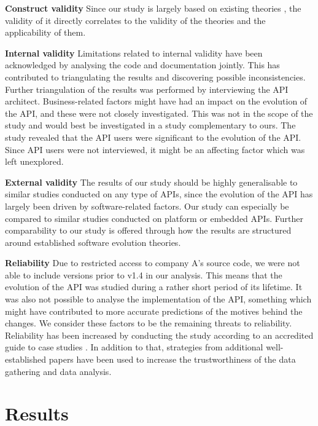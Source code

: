 \documentclass{sig-alternate}
\begin{document}
\smallskip \noindent
\textbf{Construct validity  } Since our study is largely based on existing theories \cite{chapin2001types, lehman90sview}, the validity of it directly correlates to the validity of the theories and the applicability of them. 

\smallskip \noindent
\textbf{Internal validity  } Limitations related to internal validity have been acknowledged by analysing the code and documentation jointly. This has contributed to triangulating the results and discovering possible inconsistencies. Further triangulation of the results was performed by interviewing the API architect. Business-related factors might have had an impact on the evolution of the API, and these were not closely investigated. This was not in the scope of the study and would best be investigated in a study complementary to ours. The study revealed that the API users were significant to the evolution of the API. Since API users were not interviewed, it might be an affecting factor which was left unexplored. 

\smallskip \noindent
\textbf{External validity  } The results of our study should be highly generalisable to similar studies conducted on any type of APIs, since the evolution of the API has largely been driven by software-related factors. Our study can especially be compared to similar studies conducted on platform or embedded APIs. Further comparability to our study is offered through how the results are structured around established software evolution theories. 

\smallskip \noindent
\textbf{Reliability  } Due to restricted access to company A's source code, we were not able to include versions prior to v1.4 in our analysis. This means that the evolution of the API was studied during a rather short period of its lifetime. It was also not possible to analyse the implementation of the API, something which might have contributed to more accurate predictions of the motives behind the changes. We consider these factors to be the remaining threats to reliability. Reliability has been increased by conducting the study according to an accredited guide to case studies \cite{runeson2009guidelines}. In addition to that, strategies from additional well-established papers \cite{andersson2007spiral, robson2002real, seaman1999qualitative} have been used to increase the trustworthiness of the data gathering and data analysis. 



\section{Results} \label{results} 
\end{document}
